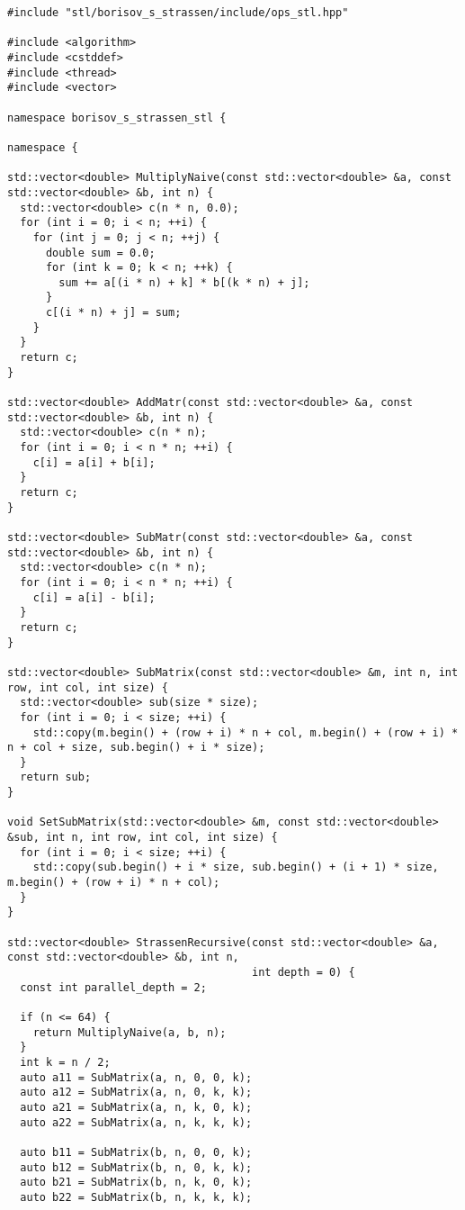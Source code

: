 \documentclass[12pt]{article}
\begin{document}
\begin{lstlisting}
#include "stl/borisov_s_strassen/include/ops_stl.hpp"

#include <algorithm>
#include <cstddef>
#include <thread>
#include <vector>

namespace borisov_s_strassen_stl {

namespace {

std::vector<double> MultiplyNaive(const std::vector<double> &a, const std::vector<double> &b, int n) {
  std::vector<double> c(n * n, 0.0);
  for (int i = 0; i < n; ++i) {
    for (int j = 0; j < n; ++j) {
      double sum = 0.0;
      for (int k = 0; k < n; ++k) {
        sum += a[(i * n) + k] * b[(k * n) + j];
      }
      c[(i * n) + j] = sum;
    }
  }
  return c;
}

std::vector<double> AddMatr(const std::vector<double> &a, const std::vector<double> &b, int n) {
  std::vector<double> c(n * n);
  for (int i = 0; i < n * n; ++i) {
    c[i] = a[i] + b[i];
  }
  return c;
}

std::vector<double> SubMatr(const std::vector<double> &a, const std::vector<double> &b, int n) {
  std::vector<double> c(n * n);
  for (int i = 0; i < n * n; ++i) {
    c[i] = a[i] - b[i];
  }
  return c;
}

std::vector<double> SubMatrix(const std::vector<double> &m, int n, int row, int col, int size) {
  std::vector<double> sub(size * size);
  for (int i = 0; i < size; ++i) {
    std::copy(m.begin() + (row + i) * n + col, m.begin() + (row + i) * n + col + size, sub.begin() + i * size);
  }
  return sub;
}

void SetSubMatrix(std::vector<double> &m, const std::vector<double> &sub, int n, int row, int col, int size) {
  for (int i = 0; i < size; ++i) {
    std::copy(sub.begin() + i * size, sub.begin() + (i + 1) * size, m.begin() + (row + i) * n + col);
  }
}

std::vector<double> StrassenRecursive(const std::vector<double> &a, const std::vector<double> &b, int n,
                                      int depth = 0) {
  const int parallel_depth = 2;

  if (n <= 64) {
    return MultiplyNaive(a, b, n);
  }
  int k = n / 2;
  auto a11 = SubMatrix(a, n, 0, 0, k);
  auto a12 = SubMatrix(a, n, 0, k, k);
  auto a21 = SubMatrix(a, n, k, 0, k);
  auto a22 = SubMatrix(a, n, k, k, k);

  auto b11 = SubMatrix(b, n, 0, 0, k);
  auto b12 = SubMatrix(b, n, 0, k, k);
  auto b21 = SubMatrix(b, n, k, 0, k);
  auto b22 = SubMatrix(b, n, k, k, k);


\end{lstlisting}
\end{document}
